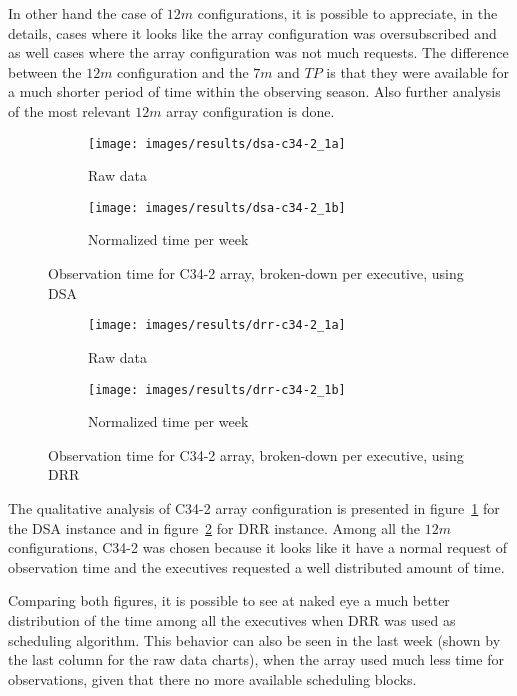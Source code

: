 In other hand the case of $12m$ configurations, it is possible to appreciate, in the details, cases where it looks like the array configuration was oversubscribed and as well cases where the array configuration was not much requests. The difference between the $12m$ configuration and the $7m$ and $TP$ is that they were available for a much shorter period of time within the observing season. Also further analysis of the most relevant $12m$ array configuration is done.

\begin{figure}[t]
\centering
	\begin{subfigure}[b]{0.49\textwidth}
		\texttt{[image: images/results/dsa-c34-2\_1a]}
        \caption{Raw data} 
    \end{subfigure} 
    \begin{subfigure}[b]{0.49\textwidth}
    		\texttt{[image: images/results/dsa-c34-2\_1b]}
            \caption{Normalized time per week} 
    \end{subfigure}
    \caption{Observation time for C34-2 array, broken-down per executive, using DSA}
    \label{fig:dsa-c34-2-exec}
\end{figure}

\begin{figure}[t]
\centering
	\begin{subfigure}[b]{0.49\textwidth}
		\texttt{[image: images/results/drr-c34-2\_1a]}
        \caption{Raw data} 
    \end{subfigure} 
    \begin{subfigure}[b]{0.49\textwidth}
    		\texttt{[image: images/results/drr-c34-2\_1b]}
            \caption{Normalized time per week} 
    \end{subfigure}
    \caption{Observation time for C34-2 array, broken-down per executive, using DRR}
    \label{fig:drr-c34-2-exec}
\end{figure}

The qualitative analysis of C34-2 array configuration is presented in figure~\ref{fig:dsa-c34-2-exec} for the DSA instance and in figure~\ref{fig:drr-c34-2-exec} for DRR instance. Among all the $12m$ configurations, C34-2 was chosen because it looks like it have a normal request of observation time and the executives requested a well distributed amount of time. 

Comparing both figures, it is possible to see at naked eye a much better distribution of the time among all the executives when DRR was used as scheduling algorithm. This behavior can also be seen in the last week (shown by the last column for the raw data charts), when the array used much less time for observations, given that there no more available scheduling blocks.

